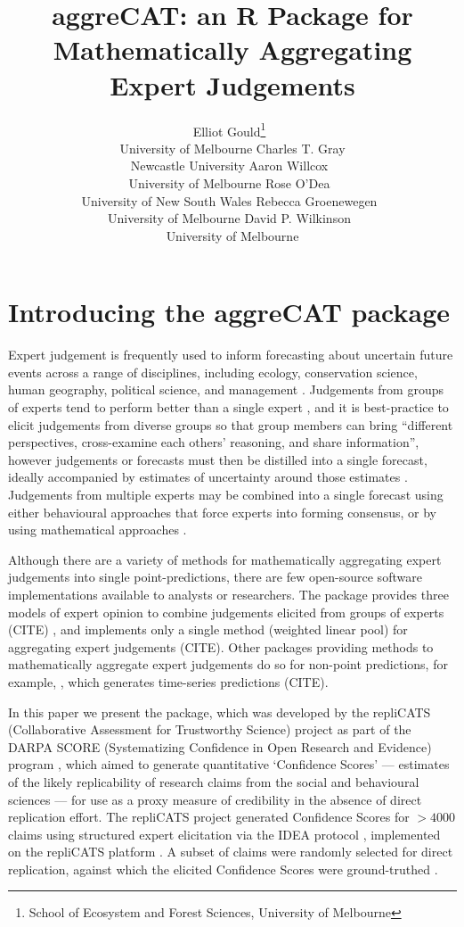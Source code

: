 \documentclass[article]{jss}
\author{Elliot
Gould\footnote{School of Ecosystem and Forest Sciences, University of
  Melbourne}~\orcidlink{0000-0002-6585-538X}\\University of
Melbourne \And Charles T. Gray\\Newcastle University \AND Aaron
Willcox~\orcidlink{0000-0003-2536-2596}\\University of
Melbourne \And Rose O'Dea~\orcidlink{0000-0001-8177-5075}\\University of
New South Wales \AND Rebecca
Groenewegen~\orcidlink{0000-0001-9177-8536}\\University of
Melbourne \And David P.
Wilkinson~\orcidlink{0000-0002-9560-6499}\\University of Melbourne}
\title{aggreCAT: an R Package for Mathematically Aggregating Expert
Judgements}
\begin{document}
\maketitle


\section{Introducing the aggreCAT package}\label{sec-introduction}

Expert judgement is frequently used to inform forecasting about
uncertain future events across a range of disciplines, including
ecology, conservation science, human geography, political science, and
management \citep{Sutherland2018}. Judgements from groups of experts
tend to perform better than a single expert \citep{Goossens2008}, and it
is best-practice to elicit judgements from diverse groups so that group
members can bring ``different perspectives, cross-examine each others'
reasoning, and share information'', however judgements or forecasts must
then be distilled into a single forecast, ideally accompanied by
estimates of uncertainty around those estimates \citep{Hanea2021}.
Judgements from multiple experts may be combined into a single forecast
using either behavioural approaches that force experts into forming
consensus, or by using mathematical approaches \citep{Goossens2008}.

Although there are a variety of methods for mathematically aggregating
expert judgements into single point-predictions, there are few
open-source software implementations available to analysts or
researchers. The  \citep{R} package  provides
three models of expert opinion to combine judgements elicited from
groups of experts (CITE) , and  implements only a single
method (weighted linear pool) for aggregating expert judgements (CITE).
Other  packages providing methods to mathematically
aggregate expert judgements do so for non-point predictions, for
example, , which generates time-series predictions (CITE).

In this paper we present the  package, which was developed
by the repliCATS (Collaborative Assessment for Trustworthy Science)
project \citep{Fraser:2021} as part of the DARPA SCORE (Systematizing
Confidence in Open Research and Evidence) program
\citep{alipourfard2021}, which aimed to generate quantitative
`Confidence Scores' --- estimates of the likely replicability of
research claims from the social and behavioural sciences --- for use as
a proxy measure of credibility in the absence of direct replication
effort. The repliCATS project generated Confidence Scores for \(> 4000\)
claims using structured expert elicitation via the IDEA protocol
\citep{hemming2017}, implemented on the repliCATS platform
\citep{Pearson2021}. A subset of claims were randomly selected for
direct replication, against which the elicited Confidence Scores were
ground-truthed \citep{Hanea2021}.
\end{document}
